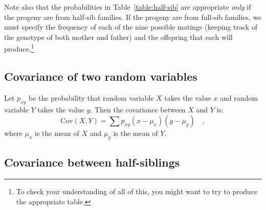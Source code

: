 \documentclass[12pt]{article}
\newcommand{\Cov}{\mbox{Cov}}
\begin{document}
Note also that the probabilities in Table~\ref{table:half-sib} are
appropriate {\it only\/} if the progeny are from half-sib families.
If the progeny are from full-sib families, we must specify the
frequency of each of the nine possible matings (keeping track of the
genotype of both mother and father) and the offspring that each will
produce.\footnote{To check your understanding of all of this, you
might want to try to produce the appropriate table.}

\subsection*{Covariance of two random variables}

Let $p_{xy}$ be the probability that random variable $X$ takes the
value $x$ and random variable $Y$ takes the value $y$.  Then the
covariance between $X$ and $Y$ is:
\[
\Cov(X,Y) = \sum p_{xy}(x - \mu_x)(y - \mu_y) \quad ,
\]
where $\mu_x$ is the mean of $X$ and $\mu_y$ is the mean of $Y$.


\subsection*{Covariance between half-siblings}
\end{document}
